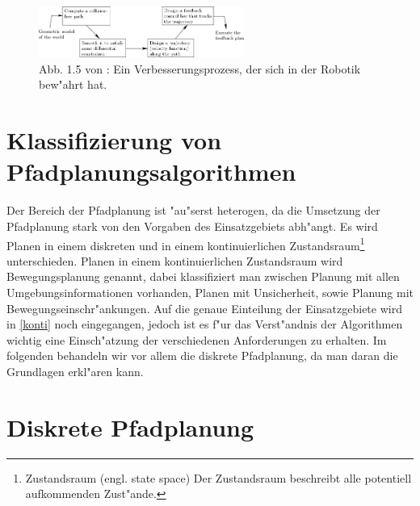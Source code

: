 \begin{figure} %
	\centering
	\includegraphics[width=0.6\textwidth]{images/img247.png}
	\caption{Abb. 1.5 von \cite[~S. 20]{Lav06}:  Ein Verbesserungsprozess, der sich in der Robotik bew"ahrt hat.}
	\label{lav02}
\end{figure}

\section{Klassifizierung von Pfadplanungsalgorithmen} \label{Kapitel 4.2} %
Der Bereich der Pfadplanung ist "au"serst heterogen, da die Umsetzung der Pfadplanung stark von den Vorgaben des Einsatzgebiets abh"angt. 
Es wird Planen in einem diskreten und in einem kontinuierlichen Zustandsraum\footnote{Zustandsraum (engl. state space) Der Zustandsraum beschreibt alle potentiell aufkommenden Zust"ande.} unterschieden. Planen in einem kontinuierlichen Zustandsraum wird Bewegungsplanung genannt, dabei klassifiziert man zwischen Planung mit allen Umgebungsinformationen vorhanden, Planen mit Unsicherheit, sowie Planung mit Bewegungseinschr"ankungen.
Auf die genaue Einteilung der Einsatzgebiete wird in \ref{konti} noch eingegangen, jedoch ist es f"ur das Verst"andnis der Algorithmen wichtig eine Einsch"atzung der verschiedenen Anforderungen zu erhalten. Im folgenden behandeln wir vor allem die diskrete Pfadplanung, da man daran die Grundlagen erkl"aren kann. \cite[~S. 24ff]{Lav06} 

\section{Diskrete Pfadplanung} \label{Kapitel 4.3} %

